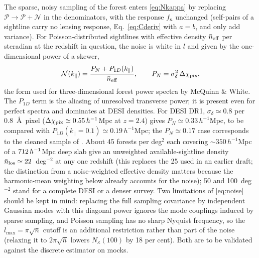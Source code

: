 \documentclass[11pt,a4paper]{article}
\newcommand{\kpar}{k_\parallel}
\newcommand{\PP}{\mathcal{P}}
\begin{document}
The sparse, noisy sampling of the forest enters \eqref{eq:Nkappa} by replacing $\PP\to\PP+\mathcal N$ in the denominators, with the response $f_\kappa$ unchanged (self-pairs of a sightline carry no lensing response, Eq.~\ref{eq:Cderiv} with $a=b$, and only add variance). For Poisson-distributed sightlines with effective density $\bar n_{\rm eff}$ per steradian at the redshift in question, the noise is white in $l$ and given by the one-dimensional power of a skewer,
\begin{equation}
\mathcal N(\kpar)=\frac{P_{N}+P_{1D}(\kpar)}{\bar n_{\rm eff}},\qquad P_N=\sigma_\delta^2\,\Delta\chi_{\rm pix},
\label{eq:noise}
\end{equation}
the form used for three-dimensional forest power spectra by McQuinn \& White. The $P_{1D}$ term is the aliasing of unresolved transverse power; it is present even for perfect spectra and dominates at DESI densities. For DESI DR1, $\sigma_\delta\simeq0.8$ per 0.8~\AA\ pixel ($\Delta\chi_{\rm pix}\simeq0.55\,h^{-1}$Mpc at $z=2.4$) gives $P_N\simeq0.33\,h^{-1}$Mpc, to be compared with $P_{1D}(\kpar=0.1)\simeq0.19\,h^{-1}$Mpc; the $P_N\simeq0.17$ case corresponds to the cleaned sample of \citet{2410.20014}. About 45 forests per deg$^2$ each covering $\sim350\,h^{-1}$Mpc of a $712\,h^{-1}$Mpc deep slab give an unweighted available-sightline density $\bar n_{\rm los}\simeq22$~deg$^{-2}$ at any one redshift (this replaces the 25 used in an earlier draft; the distinction from a noise-weighted effective density matters because the harmonic-mean weighting below already accounts for the noise); 50 and 100~deg$^{-2}$ stand for a complete DESI or a denser survey. Two limitations of \eqref{eq:noise} should be kept in mind: replacing the full sampling covariance by independent Gaussian modes with this diagonal power ignores the mode couplings induced by sparse sampling, and Poisson sampling has no sharp Nyquist frequency, so the $l_{\max}=\pi\sqrt{\bar n}$ cutoff is an additional restriction rather than part of the noise (relaxing it to $2\pi\sqrt{\bar n}$ lowers $N_\kappa(100)$ by 18 per cent). Both are to be validated against the discrete estimator on mocks.
\end{document}
